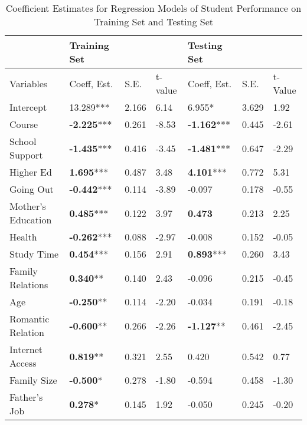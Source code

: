 \documentclass[sigconf]{acmart}
\begin{document}
\begin{table*}[ht]
  \caption{Coefficient Estimates for Regression Models of Student Performance on 
  Training Set and Testing Set}
  \label{tab:freq}
  \begin{tabular}{lllllll}
    \toprule
                        & Training Set      &        &         & Testing Set &         &          \\
    \midrule
    Variables           & Coeff, Est.        & S.E.  & t-value & Coeff, Est. & S.E. & t-Value  \\
    \midrule
    Intercept           &       13.289***    & 2.166 &  6.14  &          6.955*     & 3.629 &  1.92 \\
    Course              & \textbf{-2.225}*** & 0.261 & -8.53  & \textbf{-1.162}***  & 0.445 & -2.61 \\
    School Support      & \textbf{-1.435}*** & 0.416 & -3.45  & \textbf{-1.481}***  & 0.647 & -2.29 \\
    Higher Ed           & \textbf{ 1.695}*** & 0.487 &  3.48  & \textbf{ 4.101}***  & 0.772 &  5.31 \\
    Going Out           & \textbf{-0.442}*** & 0.114 & -3.89  &         -0.097      & 0.178 & -0.55 \\
    Mother's Education  & \textbf{ 0.485}*** & 0.122 &  3.97  & \textbf{ 0.473}     & 0.213 &  2.25 \\
    Health              & \textbf{-0.262}*** & 0.088 & -2.97  &         -0.008      & 0.152 & -0.05 \\
    Study Time          & \textbf{ 0.454}*** & 0.156 &  2.91  & \textbf{ 0.893}***  & 0.260 &  3.43 \\
    Family Relations    & \textbf{ 0.340}**  & 0.140 &  2.43  &         -0.096      & 0.215 & -0.45 \\
    Age                 & \textbf{-0.250}**  & 0.114 & -2.20  &         -0.034      & 0.191 & -0.18 \\
    Romantic Relation   & \textbf{-0.600}**  & 0.266 & -2.26  & \textbf{-1.127}**   & 0.461 & -2.45 \\
    Internet Access     & \textbf{ 0.819}**  & 0.321 &  2.55  &          0.420      & 0.542 &  0.77 \\
    Family Size         & \textbf{-0.500}*   & 0.278 & -1.80  &         -0.594      & 0.458 & -1.30 \\
    Father's Job        & \textbf{ 0.278}*   & 0.145 &  1.92  &         -0.050      & 0.245 & -0.20 \\


\end{tabular}
\end{table*}
\end{document}
